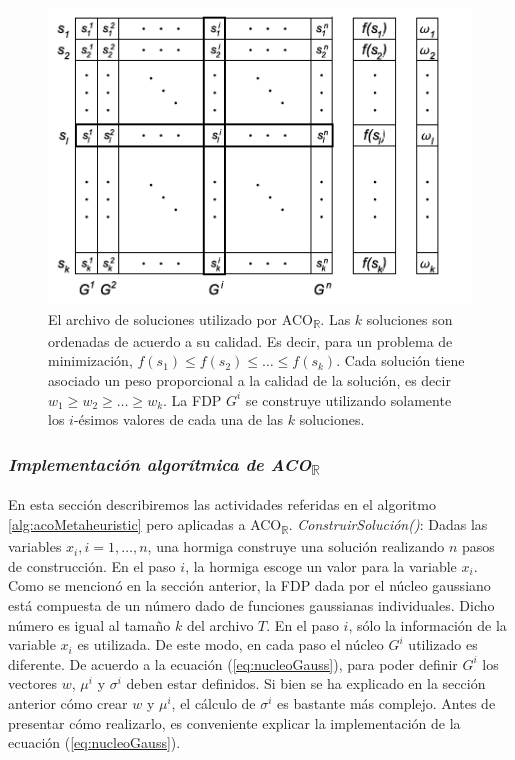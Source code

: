 \documentclass{llncs}
\begin{document}
	\begin{figure}[h!]
		\centering
		\includegraphics[scale=0.5]{archive.png}
		\caption{El archivo de soluciones utilizado por ACO\textsubscript{$\mathbb{R}$}. Las $k$ soluciones son ordenadas de acuerdo a su calidad.
		Es decir, para un problema de minimización, $f(s_1) \leq f(s_2) \leq \dots \leq f(s_k)$. Cada solución tiene asociado un peso
		proporcional a la calidad de la solución, es decir $w_1 \geq w_2 \geq \dots \geq w_k$. La FDP $G^i$ se construye utilizando solamente
		los $i$-ésimos valores de cada una de las $k$ soluciones.}
		\label{fig:archivo}
	\end{figure}
	
	\subsubsection{\textit{Implementación algorítmica de ACO\textsubscript{$\mathbb{R}$}}}
	En esta sección describiremos las actividades referidas en el algoritmo  \ref{alg:acoMetaheuristic} pero aplicadas a ACO\textsubscript{$\mathbb{R}$}.
	\bigbreak
	\textit{ConstruirSolución()}: Dadas las variables $x_i, i = 1, \dots, n$, una hormiga construye una solución realizando $n$ pasos de
	construcción. En el paso $i$, la hormiga escoge un valor para la variable $x_i$. Como se mencionó en la sección anterior, la FDP dada
	por el núcleo gaussiano está compuesta de un número dado de funciones gaussianas individuales. Dicho número es igual al tamaño
	$k$ del archivo $T$. En el paso $i$, sólo la información de la variable $x_i$ es utilizada. De este modo, en cada paso el núcleo $G^i$
	utilizado es diferente. De acuerdo a la ecuación (\ref{eq:nucleoGauss}), para poder definir $G^i$ los vectores $w$, $\mu^i$ y 
	$\sigma^i$ deben estar definidos. Si bien se ha explicado en la sección anterior cómo crear $w$ y $\mu^i$, el cálculo de 
	$\sigma^i$ es bastante más complejo. Antes de presentar cómo realizarlo, es conveniente explicar la implementación de la
	ecuación (\ref{eq:nucleoGauss}).
	
\end{document}
